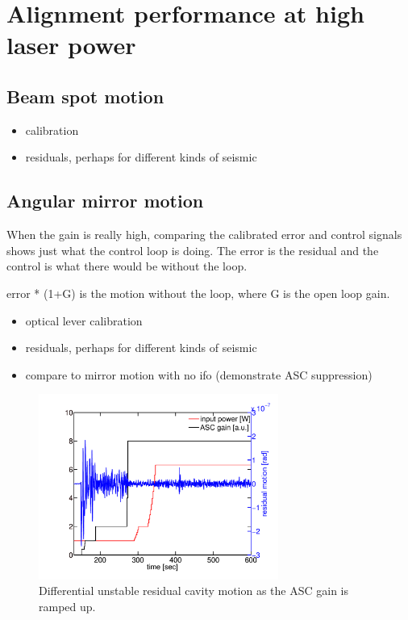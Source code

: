 \chapter{Alignment performance at high laser power}
\section{Beam spot motion}
\begin{itemize} 
\item calibration
\item residuals, perhaps for different kinds of seismic
\end{itemize}

\section{Angular mirror motion}
When the gain is really high, comparing the calibrated error and
control signals shows just what the control loop is doing. The error
is the residual and the control is what there would be without the
loop.

error * (1+G) is the motion without the loop, where G is the open loop gain.

\begin{itemize} 
\item optical lever calibration
\item residuals, perhaps for different kinds of seismic
\item compare to mirror motion with no ifo (demonstrate ASC suppression)
\end{itemize}


\begin{figure}
\begin{centering}
\includegraphics[width=0.7\textwidth]{figures/wfs1p_onoff.pdf}
\caption{Differential unstable residual cavity motion as the ASC gain
  is ramped up.}
\label{fig:wfs1_onoff}
\end{centering}
\end{figure}

